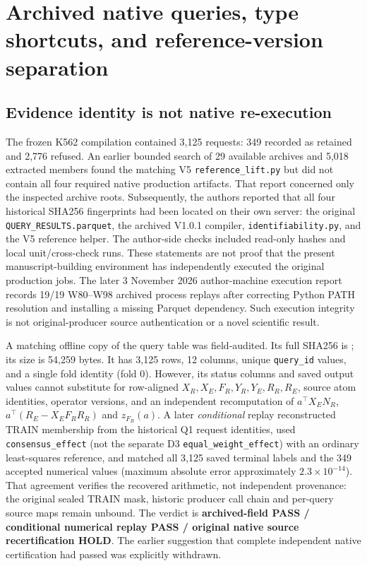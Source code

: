 \clearpage
\section{Archived native queries, type shortcuts, and reference-version separation}
\label{supp:native}
\subsection{Evidence identity is not native re-execution}
The frozen K562 compilation contained 3,125 requests: 349 recorded as retained and 2,776 refused. An earlier bounded search of 29 available archives and 5,018 extracted members found the matching V5 \texttt{reference\_lift.py} but did not contain all four required native production artifacts. That report concerned only the inspected archive roots. Subsequently, the authors reported that all four historical SHA256 fingerprints had been located on their own server: the original \texttt{QUERY\_RESULTS.parquet}, the archived V1.0.1 compiler, \texttt{identifiability.py}, and the V5 reference helper. The author-side checks included read-only hashes and local unit/cross-check runs. These statements are not proof that the present manuscript-building environment has independently executed the original production jobs. The later 3 November 2026 author-machine execution report records 19/19 W80--W98 archived process replays after correcting Python PATH resolution and installing a missing Parquet dependency. Such execution integrity is not original-producer source authentication or a novel scientific result.

A matching offline copy of the query table was field-audited. Its full SHA256 is \texttt{}; its size is 54,259 bytes. It has 3,125 rows, 12 columns, unique \texttt{query\_id} values, and a single fold identity (fold 0). However, its status columns and saved output values cannot substitute for row-aligned $X_R,X_E,F_R,Y_R,Y_E,R_R,R_E$, source atom identities, operator versions, and an independent recomputation of $a^\top X_EN_R$, $a^\top(R_E-X_EF_RR_R)$ and $z_{F_R}(a)$. A later \emph{conditional} replay reconstructed TRAIN membership from the historical Q1 request identities, used \texttt{consensus\_effect} (not the separate D3 \texttt{equal\_weight\_effect}) with an ordinary least-squares reference, and matched all 3,125 saved terminal labels and the 349 accepted numerical values (maximum absolute error approximately $2.3\times10^{-14}$). That agreement verifies the recovered arithmetic, not independent provenance: the original sealed TRAIN mask, historic producer call chain and per-query source maps remain unbound. The verdict is \textbf{archived-field PASS / conditional numerical replay PASS / original native source recertification HOLD}. The earlier suggestion that complete independent native certification had passed was explicitly withdrawn.

